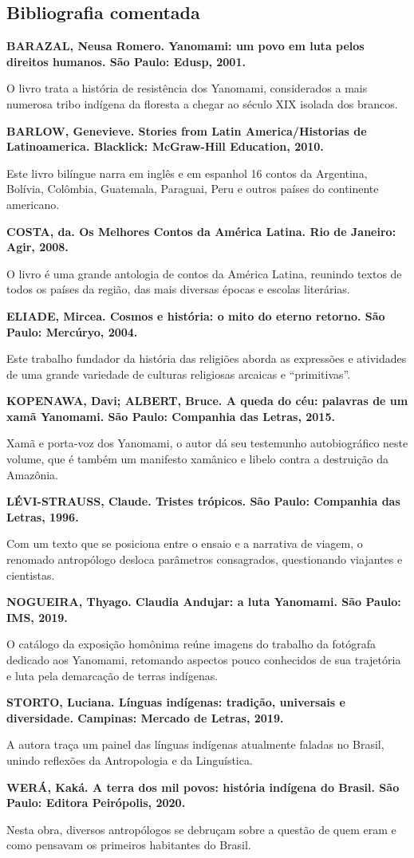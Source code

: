 \documentclass[12pt]{extarticle}
\begin{document}
\subsection{Bibliografia comentada}

\textbf{BARAZAL, Neusa Romero. Yanomami: um povo em luta pelos direitos
humanos. São Paulo: Edusp, 2001.}

O livro trata a história de resistência dos Yanomami, considerados a
mais numerosa tribo indígena da floresta a chegar ao século XIX isolada
dos brancos.

\textbf{BARLOW, Genevieve. Stories from Latin America/Historias de
Latinoamerica. Blacklick: McGraw-Hill Education, 2010.}

Este livro bilíngue narra em inglês e em espanhol 16 contos da
Argentina, Bolívia, Colômbia, Guatemala, Paraguai, Peru e outros países
do continente americano.

\textbf{COSTA, da. Os Melhores Contos da América Latina. Rio de Janeiro: Agir,
2008.}


O livro é uma grande antologia de contos da América Latina, reunindo
textos de todos os países da região, das mais diversas épocas e escolas
literárias.

\textbf{ELIADE, Mircea. Cosmos e história: o mito do eterno retorno. São
Paulo: Mercúryo, 2004.}

Este trabalho fundador da história das religiões aborda as expressões e
atividades de uma grande variedade de culturas religiosas arcaicas e
``primitivas''.

\textbf{KOPENAWA, Davi; ALBERT, Bruce. A queda do céu: palavras de um
xamã Yanomami. São Paulo: Companhia das Letras, 2015.}

Xamã e porta-voz dos Yanomami, o autor dá seu testemunho autobiográfico
neste volume, que é também um manifesto xamânico e libelo contra a
destruição da Amazônia.

\textbf{LÉVI-STRAUSS, Claude. Tristes trópicos. São Paulo: Companhia das
Letras, 1996.}

Com um texto que se posiciona entre o ensaio e a narrativa de viagem, o
renomado antropólogo desloca parâmetros consagrados, questionando
viajantes e cientistas.

\textbf{NOGUEIRA, Thyago. Claudia Andujar: a luta Yanomami. São Paulo:
IMS, 2019.}

O catálogo da exposição homônima reúne imagens do trabalho da fotógrafa
dedicado aos Yanomami, retomando aspectos pouco conhecidos de sua
trajetória e luta pela demarcação de terras indígenas.

\textbf{STORTO, Luciana. Línguas indígenas: tradição, universais e
diversidade. Campinas: Mercado de Letras, 2019.}

A autora traça um painel das línguas indígenas atualmente faladas no
Brasil, unindo reflexões da Antropologia e da Linguística.

\textbf{WERÁ, Kaká. A terra dos mil povos: história indígena do Brasil.
São Paulo: Editora Peirópolis, 2020.}

Nesta obra, diversos antropólogos se debruçam sobre a questão de quem
eram e como pensavam os primeiros habitantes do Brasil.
\end{document}
